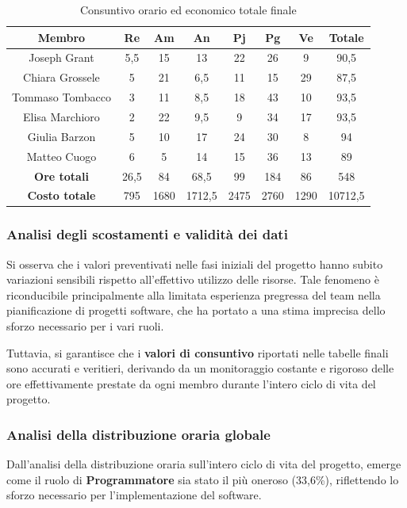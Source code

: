 \documentclass[11pt,a4paper]{article}
\begin{document}
\begin{table}[H]
    \centering
    \begin{tabular}{|c|c|c|c|c|c|c|c|}
        \hline
        \textbf{Membro} & \textbf{Re} & \textbf{Am} & \textbf{An} & \textbf{Pj} & \textbf{Pg} & \textbf{Ve} & \textbf{Totale} \\
        \hline
        Joseph Grant & 5,5 & 15 & 13 & 22 & 26 & 9 & 90,5 \\
        Chiara Grossele & 5 & 21 & 6,5 & 11 & 15 & 29 & 87,5 \\
        Tommaso Tombacco & 3 & 11 & 8,5 & 18 & 43 & 10 & 93,5 \\
        Elisa Marchioro & 2 & 22 & 9,5 & 9 & 34 & 17 & 93,5 \\
        Giulia Barzon & 5 & 10 & 17 & 24 & 30 & 8 & 94 \\
        Matteo Cuogo & 6 & 5 & 14 & 15 & 36 & 13 & 89 \\
        \hline
        \textbf{Ore totali} & 26,5 & 84 & 68,5 & 99 & 184 & 86 & 548 \\
        \hline
        \textbf{Costo totale} & 795 & 1680 & 1712,5 & 2475 & 2760 & 1290 & 10712,5 \\
        \hline
    \end{tabular}
    \caption{Consuntivo orario ed economico totale finale}
\end{table}

\subsubsection{Analisi degli scostamenti e validità dei dati}
Si osserva che i valori preventivati nelle fasi iniziali del progetto hanno subito variazioni sensibili rispetto all’effettivo utilizzo delle risorse. Tale fenomeno è riconducibile principalmente alla limitata esperienza pregressa del team nella pianificazione di progetti software, che ha portato a una stima imprecisa dello sforzo necessario per i vari ruoli.

Tuttavia, si garantisce che i \textbf{valori di consuntivo} riportati nelle tabelle finali sono accurati e veritieri, derivando da un monitoraggio costante e rigoroso delle ore effettivamente prestate da ogni membro durante l'intero ciclo di vita del progetto.

\subsubsection{Analisi della distribuzione oraria globale}
Dall'analisi della distribuzione oraria sull'intero ciclo di vita del progetto, emerge come il ruolo di \textbf{Programmatore} sia stato il più oneroso (33,6\%), riflettendo lo sforzo necessario per l'implementazione del software.
\end{document}
